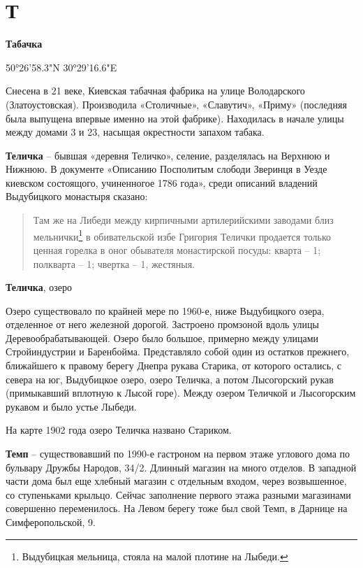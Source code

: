\chapter*{Т}

\textbf{Табачка}

50°26'58.3"N 30°29'16.6"E

Снесена в 21 веке, Киевская табачная фабрика на улице Володарского (Златоустовская). Производила  «Столичные», «Славутич», «Приму» (последняя была выпущена впервые именно на этой фабрике). Находилась в начале улицы между домами 3 и 23, насыщая окрестности запахом табака.\\

\medskip

\textbf{Теличка} – бывшая «деревня Теличко», селение, разделялась на Верхнюю и Нижнюю. В документе «Описанию Посполитым слободи Зверинця в Уезде киевском состоящого, учиненногое 1786 года», среди описаний владений Выдубицкого монастыря сказано:

\begin{quotation}
Там же на Либеди между кирпичными артилерийскими заводами близ мельнички\footnote{Выдубицкая мельница, стояла на малой плотине на Лыбеди.} в обивательской избе Григория Телички продается только ценная горелка в оног обывателя монастирской посуды: кварта – 1; полкварта – 1; чвертка – 1, жестяныя.\end{quotation}


\medskip

\textbf{Теличка}, озеро

Озеро существовало по крайней мере по 1960-е, ниже Выдубицкого озера, отделенное от него железной дорогой. Застроено промзоной вдоль улицы Деревообрабатывающей. Озеро было большое, примерно между улицами Стройиндустрии и Баренбойма. Представляло собой один из остатков прежнего, ближайшего к правому берегу Днепра рукава Старика, от которого остались, с севера на юг, Выдубицкое озеро, озеро Теличка, а потом Лысогорский рукав (примыкавший вплотную к Лысой горе). Между озером Теличкой и Лысогорским рукавом и было устье Лыбеди.

На карте 1902 года озеро Теличка названо Стариком.\\


\medskip

\textbf{Темп} – существовавший по 1990-е гастроном на первом этаже углового дома по бульвару Дружбы Народов, 34/2. Длинный магазин на много отделов. В западной части дома был еще хлебный магазин с отдельным входом, через возвышенное, со ступеньками крыльцо. Сейчас заполнение первого этажа разными магазинами совершенно переменилось. На Левом берегу тоже был свой Темп, в Дарнице на Симферопольской, 9.\\


